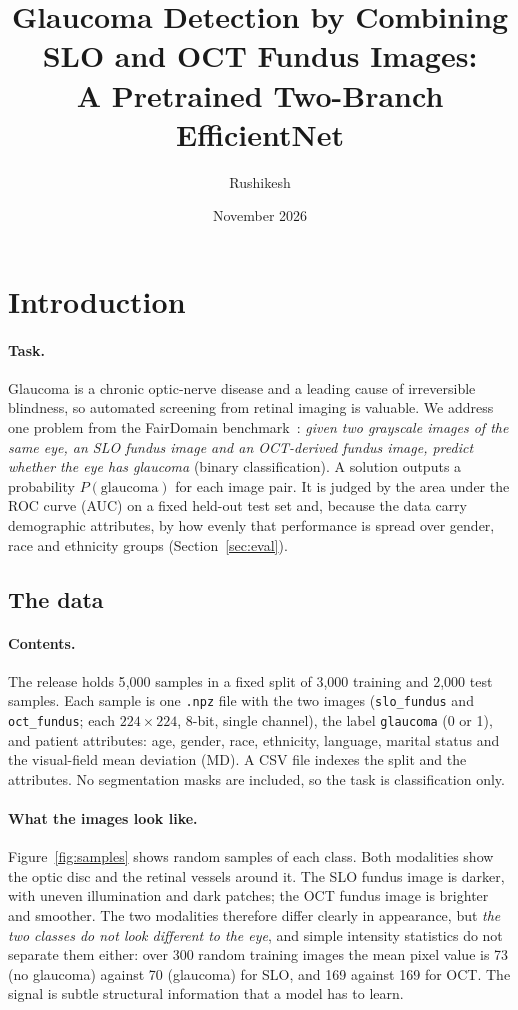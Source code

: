 \documentclass[11pt]{article}
\title{Glaucoma Detection by Combining SLO and OCT Fundus Images:\\
A Pretrained Two-Branch EfficientNet}
\author{Rushikesh}
\date{November 2026}
\begin{document}
\maketitle

\section{Introduction}
\paragraph{Task.}
Glaucoma is a chronic optic-nerve disease and a leading cause of irreversible blindness, so automated screening from retinal imaging is valuable. We address one problem from the FairDomain benchmark~\cite{fairdomain}:
\emph{given two grayscale images of the same eye, an SLO fundus image and an OCT-derived fundus image, predict whether the eye has glaucoma} (binary classification).
A solution outputs a probability $P(\text{glaucoma})$ for each image pair. It is judged by the area under the ROC curve (AUC) on a fixed held-out test set and, because the data carry demographic attributes,
by how evenly that performance is spread over gender, race and ethnicity groups (Section~\ref{sec:eval}).

\subsection{The data}
\paragraph{Contents.}
The release holds 5{,}000 samples in a fixed split of 3{,}000 training and 2{,}000 test samples. Each sample is one \texttt{.npz} file with the two images (\texttt{slo\_fundus} and \texttt{oct\_fundus}; each $224\times224$, 8-bit, single channel),
the label \texttt{glaucoma} (0 or 1), and patient attributes: age, gender, race, ethnicity, language, marital status and the visual-field mean deviation (MD). A CSV file indexes the split and the attributes. No segmentation masks are included, so the task is classification only.

\paragraph{What the images look like.}
Figure~\ref{fig:samples} shows random samples of each class. Both modalities show the optic disc and the retinal vessels around it. The SLO fundus image is darker, with uneven illumination and dark patches; the OCT fundus image is brighter and smoother.
The two modalities therefore differ clearly in appearance, but \emph{the two classes do not look different to the eye}, and simple intensity statistics do not separate them either: over 300 random training images the mean pixel value is 73 (no glaucoma) against 70 (glaucoma) for SLO,
and 169 against 169 for OCT. The signal is subtle structural information that a model has to learn.
\end{document}

